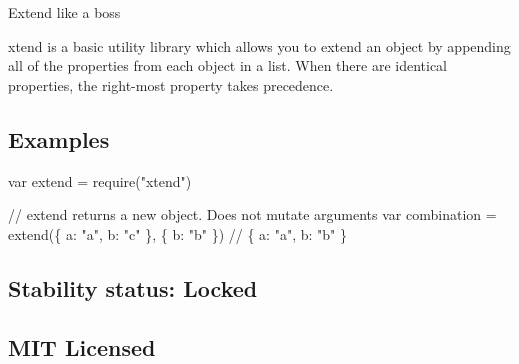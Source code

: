 \href{http://ci.testling.com/Raynos/xtend}{\tt }

\href{http://github.com/badges/stability-badges}{\tt }

Extend like a boss

xtend is a basic utility library which allows you to extend an object by appending all of the properties from each object in a list. When there are identical properties, the right-\/most property takes precedence.

\subsection*{Examples}


\begin{DoxyCode}
var extend = require("xtend")

// extend returns a new object. Does not mutate arguments
var combination = extend(\{
    a: "a",
    b: "c"
\}, \{
    b: "b"
\})
// \{ a: "a", b: "b" \}
\end{DoxyCode}


\subsection*{Stability status\+: Locked}

\subsection*{M\+IT Licensed}